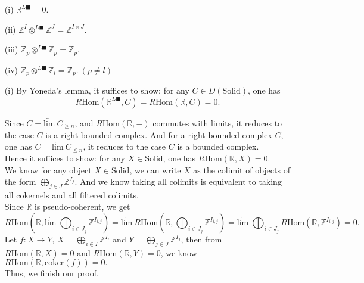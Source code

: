 \documentclass[UTF8,12,a4paper]{ctexart}
\theoremstyle{definition}
\begin{document}
\prop 
\begin{itemize}
	\item [(i)] $\mathbb{R}^{L\blacksquare}=0.$
	\item [(ii)] $\mathbb{Z}^I\otimes^{L\blacksquare} \mathbb{Z}^J=\mathbb{Z}^{I\times J}.$
	\item [(iii)] $\mathbb{Z}_p\otimes^{L\blacksquare}\mathbb{Z}_p=\mathbb{Z}_p.$
	\item [(iv)]$\mathbb{Z}_p\otimes^{L\blacksquare}\mathbb{Z}_l=\mathbb{Z}_p.\ (p\neq l)$
\end{itemize}
\pf 
\begin{itemize}
	\item [(i)]
	By Yoneda's lemma, it suffices to show: for any $
	C\in D(\text{Solid})$, one has 
	$$
	R\text{Hom}(\mathbb{R}^{L\blacksquare},C)=
	R\text{Hom}(\mathbb{R},C)=0.
	$$
	
	Since $C=\underleftarrow{\text{lim}}\ C_{\geq n}$, and $R\text{Hom}(\mathbb{R},-)$ commutes with limits, it reduces to the case $C$ is a right bounded complex. And for a right bounded complex $C$, one has $C=\underleftarrow{\text{lim}}\ C_{\leq n}$, it reduces to the case $C$ is a bounded complex.\\
	 Hence it suffices to show: for any $X\in \text{Solid}$, one has $R\text{Hom}(\mathbb{R},X)=0.$ \\
	We know for any object $X\in \text{Solid}$, we can write $X$ as the colimit of objects of the form $\bigoplus_{j\in J}\mathbb{Z}^{I_j}.$ And we know taking all colimits is equivalent to taking all cokernels and all filtered colimits.\\
	Since $\mathbb{R}$ is pseudo-coherent, we get 
	$$
	R\text{Hom}(\mathbb{R},\underrightarrow{\text{lim}}\  \bigoplus_{i\in J_j}\mathbb{Z}^{I_{i,j}})=\underrightarrow{\text{lim}}\ 
		R\text{Hom}(\mathbb{R},\bigoplus_{i\in J_j}\mathbb{Z}^{I_{i,j}})=\underrightarrow{\text{lim}}\ \bigoplus_{i\in J_j}
		R\text{Hom}(\mathbb{R},\mathbb{Z}^{I_{i,j}})=0.
	$$
	Let $f:X\rightarrow Y$, $X=\bigoplus_{i\in I}\mathbb{Z}^{I_i}$ and $Y=\bigoplus_{j\in J}\mathbb{Z}^{I_j}$, then from $R\text{Hom}(\mathbb{R},X)=0$ and $R\text{Hom}(\mathbb{R},Y)=0$, we know $R\text{Hom}(\mathbb{R},\text{coker}(f))=0.$\\
	Thus, we finish our proof.
	

\end{itemize}
\end{document}
